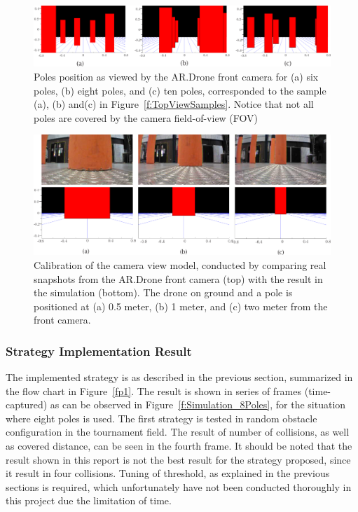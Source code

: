 \begin{figure}[h]
\includegraphics[width=1\linewidth]{Figures/CameraViewSamples_3.png}
\centering
\caption{Poles position as viewed by the AR.Drone front camera for (a) six poles, (b) eight poles, and (c) ten poles, corresponded to the sample (a), (b) and(c) in Figure~\ref{f:TopViewSamples}. Notice that not all poles are covered by the camera field-of-view (FOV)}
\label{f:CameraViewSamples}
\end{figure} 

\begin{figure}
\includegraphics[width=1\linewidth]{Figures/Calibrations.png}
\centering
\caption{Calibration of the camera view model, conducted by comparing real snapshots from the AR.Drone front camera (top) with the result in the simulation (bottom). The drone on ground and a pole is positioned at (a) 0.5 meter, (b) 1 meter, and (c) two meter from the front camera.}
\label{f:Calibrations}
\end{figure} 



\subsubsection{Strategy Implementation Result}
The implemented strategy is as described in the previous section, summarized in the flow chart in Figure~\ref{fp1}. The result is shown in series of frames (time-captured) as can be observed in Figure~\ref{f:Simulation_8Poles}, for the situation where eight poles is used. The first strategy is tested in random obstacle configuration in the tournament field. The result of number of collisions, as well as covered distance, can be seen in the fourth frame. It should be noted that the result shown in this report is not the best result for the strategy proposed, since it result in four collisions. Tuning of threshold, as explained in the previous sections is required, which unfortunately have not been conducted thoroughly in this project due the limitation of time.

